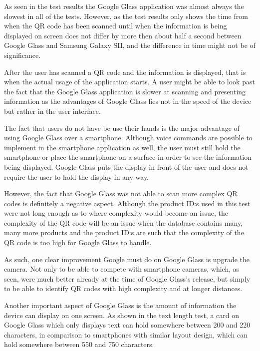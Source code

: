 As seen in the test results the Google Glass application was almost always the slowest in all of the tests. However, as the test results only shows the time from when the QR code has been scanned until when the information is being displayed on screen does not differ by more then about half a second between Google Glass and Samsung Galaxy SII, and the difference in time might not be of significance. 

After the user has scanned a QR code and the information is displayed, that is when the actual usage of the application starts. A user might be able to look past the fact that the Google Glass application is slower at scanning and presenting information as the advantages of Google Glass lies not in the speed of the device but rather in the user interface.

The fact that users do not have be use their hands is the major advantage of using Google Glass over a smartphone. Although voice commands are possible to implement in the smartphone application as well, the user must still hold the smartphone or place the smartphone on a surface in order to see the information being displayed. Google Glass puts the display in front of the user and does not require the user to hold the display in any way.

However, the fact that Google Glass was not able to scan more complex QR codes is definitely a negative aspect. Although the product ID:s used in this test were not long enough as to where complexity would become an issue, the complexity of the QR code will be an issue when the database contains many, many more products and the product ID:s are such that the complexity of the QR code is too high for Google Glass to handle.

As such, one clear improvement Google must do on Google Glass is upgrade the camera. Not only to be able to compete with smartphone cameras, which, as seen, were much better already at the time of Google Glass's release, but simply to be able to identify QR codes with high complexity and at longer distances.

Another important aspect of Google Glass is the amount of information the device can display on one screen. As shown in the text length test, a card on Google Glass which only displays text can hold somewhere between 200 and 220 characters, in comparison to smartphones with similar layout design, which can hold somewhere between 550 and 750 characters.

